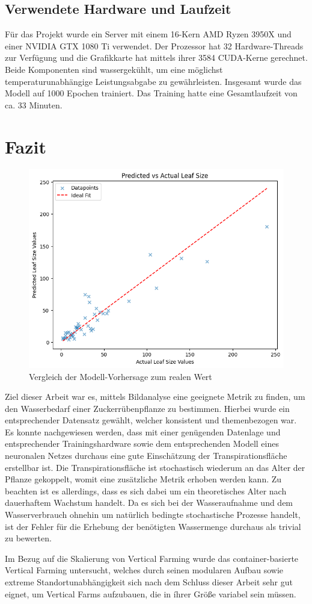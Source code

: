 \subsection{Verwendete Hardware und Laufzeit}
Für das Projekt wurde ein Server mit einem 16-Kern AMD Ryzen 3950X und einer NVIDIA GTX 1080 Ti verwendet. Der Prozessor hat 32 Hardware-Threads zur Verfügung und die Grafikkarte hat mittels ihrer 3584 CUDA-Kerne gerechnet. Beide Komponenten sind wassergekühlt, um eine möglichst temperaturunabhängige Leistungsabgabe zu gewährleisten. Insgesamt wurde das Modell auf 1000 Epochen trainiert. Das Training hatte eine Gesamtlaufzeit von ca. 33 Minuten.
\section{Fazit}
\begin{figure}
    \centering
    \includegraphics[width=0.8\linewidth]{scatter.png}
    \caption{Vergleich der Modell-Vorhersage zum realen Wert}
    \label{fig:enter-label}
\end{figure}
Ziel dieser Arbeit war es, mittels Bildanalyse eine geeignete Metrik zu finden, um den Wasserbedarf einer Zuckerrübenpflanze zu bestimmen. Hierbei wurde ein entsprechender Datensatz gewählt, welcher konsistent und themenbezogen war. Es konnte nachgewiesen werden, dass mit einer genügenden Datenlage und entsprechender Trainingshardware sowie dem entsprechenden Modell eines neuronalen Netzes durchaus eine gute Einschätzung der Transpirationsfläche erstellbar ist. Die Transpirationsfläche ist stochastisch wiederum an das Alter der Pflanze gekoppelt, womit eine zusätzliche Metrik erhoben werden kann. Zu beachten ist es allerdings, dass es sich dabei um ein theoretisches Alter nach dauerhaftem Wachstum handelt. Da es sich bei der Wasseraufnahme und dem Wasserverbrauch ohnehin um natürlich bedingte stochastische Prozesse handelt, ist der Fehler für die Erhebung der benötigten Wassermenge durchaus als trivial zu bewerten. \newline \par Im Bezug auf die Skalierung von Vertical Farming wurde das container-basierte Vertical Farming untersucht, welches durch seinen modularen Aufbau sowie extreme Standortunabhängigkeit sich nach dem Schluss dieser Arbeit sehr gut eignet, um Vertical Farms aufzubauen, die in íhrer Größe variabel sein müssen.
